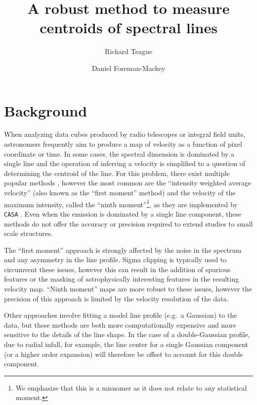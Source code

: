 \documentclass[rnaas]{aastex62}
\begin{document}
\raggedbottom\sloppy\sloppypar\frenchspacing

\title{%
A robust method to measure centroids of spectral lines
}

\author[0000-0003-1534-5186]{Richard Teague}

\author[0000-0002-9328-5652]{Daniel Foreman-Mackey}


\section{Background}

When analyzing data cubes produced by radio telescopes or integral field units,
astronomers frequently aim to produce a map of velocity as a function of pixel
coordinate or time.
In some cases, the spectral dimension is dominated by a single line and the
operation of inferring a velocity is simplified to a question of determining
the centroid of the line.
For this problem, there exist multiple popular methods \citep[see, for
example][]{deBlok:2008}, however the most common are the ``intensity weighted
average velocity'' (also known as the ``first moment'' method) and the
velocity of the maximum intensity, called the ``ninth moment''\footnote{We
emphasize that this is a misnomer as it does not relate to any statistical
moment.}, as they are implemented by \texttt{CASA} \citep{McMullin:2007}.
Even when the emission is dominated by a single line component, these methods
do not offer the accuracy or precision required to extend studies to small
scale structures.

The ``first moment'' approach is strongly affected by the noise in the spectrum
and any asymmetry in the line profile.
Sigma clipping is typically used to circumvent these issues, however this can
result in the addition of spurious features or the masking of astrophysically
interesting features in the resulting velocity map.
``Ninth moment'' maps are more robust to these issues, however the precision of
this approach is limited by the velocity resolution of the data.

Other approaches involve fitting a model line profile (e.g.~a Gaussian) to the
data, but these methods are both more computationally expensive and more
sensitive to the details of the line shape.
In the case of a double-Gaussian profile, due to radial infall, for example, the
line center for a single Gaussian component (or a higher order expansion) will
therefore be offset to account for this double component.
\end{document}
